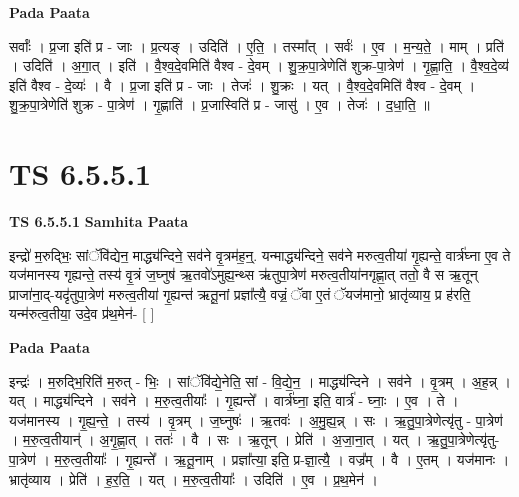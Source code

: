 \documentclass[17pt]{extarticle}
\begin{document}
\textbf{Pada Paata} \newline

सर्वाः᳚ । प्र॒जा इति॑ प्र - जाः । प्र॒त्यङ् । उदिति॑ । ए॒ति॒ । तस्मा᳚त् । सर्वः॑ । ए॒व । म॒न्य॒ते॒ । माम् । प्रति॑ । उदिति॑ । अ॒गा॒त् । इति॑ । वै॒श्व॒दे॒वमिति॑ वैश्व - दे॒वम् । शु॒क्र॒पा॒त्रेणेति॑ शुक्र-पा॒त्रेण॑ । गृ॒ह्णा॒ति॒ । वै॒श्व॒दे॒व्य॑ इति॑ वैश्व - दे॒व्यः॑ । वै । प्र॒जा इति॑ प्र - जाः । तेजः॑ । शु॒क्रः । यत् । वै॒श्व॒दे॒वमिति॑ वैश्व - दे॒वम् । शु॒क्र॒पा॒त्रेणेति॑ शुक्र - पा॒त्रेण॑ । गृ॒ह्णाति॑ । प्र॒जास्विति॑ प्र - जासु॑ । ए॒व । तेजः॑ । द॒धा॒ति॒ ॥  \newline





\section{ TS 6.5.5.1 }

\textbf{TS 6.5.5.1 } \newline
\textbf{Samhita Paata} \newline

इन्द्रो॑ म॒रुद्भिः॒ सांॅवि॑द्येन॒ माद्ध्य॑न्दिने॒ सव॑ने वृ॒त्रम॑ह॒न्॒. यन्माद्ध्य॑न्दिने॒ सव॑ने मरुत्व॒तीया॑ गृ॒ह्यन्ते॒ वार्त्र॑घ्ना ए॒व ते यज॑मानस्य गृह्यन्ते॒ तस्य॑ वृ॒त्रं ज॒घ्नुष॑ ऋ॒तवो॑ऽमुह्य॒न्थ्स ऋ॑तुपा॒त्रेण॑ मरुत्व॒तीया॑नगृह्णा॒त् ततो॒ वै स ऋ॒तून् प्राजा॑ना॒द्-यदृ॑तुपा॒त्रेण॑ मरुत्व॒तीया॑ गृ॒ह्यन्त॑ ऋतू॒नां प्रज्ञा᳚त्यै॒ वज्रं॒ ॅवा ए॒तं ॅयज॑मानो॒ भ्रातृ॑व्याय॒ प्र ह॑रति॒ यन्म॑रुत्व॒तीया॒ उदे॒व प्र॑थ॒मेन॑- [  ] \newline

\textbf{Pada Paata} \newline

इन्द्रः॑ । म॒रुद्भि॒रिति॑ म॒रुत् - भिः॒ । सांॅवि॑द्ये॒नेति॒ सां - वि॒द्ये॒न॒ । माद्ध्य॑न्दिने । सव॑ने । वृ॒त्रम् । अ॒ह॒न्न् । यत् । माद्ध्य॑न्दिने । सव॑ने । म॒रु॒त्व॒तीयाः᳚ । गृ॒ह्यन्ते᳚ । वार्त्र॑घ्ना॒ इति॒ वार्त्र॑ - घ्नाः॒ । ए॒व । ते । यज॑मानस्य । गृ॒ह्य॒न्ते॒ । तस्य॑ । वृ॒त्रम् । ज॒घ्नुषः॑ । ऋ॒तवः॑ । अ॒मु॒ह्य॒न्न् । सः । ऋ॒तु॒पा॒त्रेणेत्यृ॑तु - पा॒त्रेण॑ । म॒रु॒त्व॒तीयान्॑ । अ॒गृ॒ह्णा॒त् । ततः॑ । वै । सः । ऋ॒तून् । प्रेति॑ । अ॒जा॒ना॒त् । यत् । ऋ॒तु॒पा॒त्रेणेत्यृ॑तु-पा॒त्रेण॑ । म॒रु॒त्व॒तीयाः᳚ । गृ॒ह्यन्ते᳚ । ऋ॒तू॒नाम् । प्रज्ञा᳚त्या॒ इति॒ प्र-ज्ञा॒त्यै॒ । वज्र᳚म् । वै । ए॒तम् । यज॑मानः । भ्रातृ॑व्याय । प्रेति॑ । ह॒र॒ति॒ । यत् । म॒रु॒त्व॒तीयाः᳚ । उदिति॑ । ए॒व । प्र॒थ॒मेन॑ ।  \newline
\end{document}
